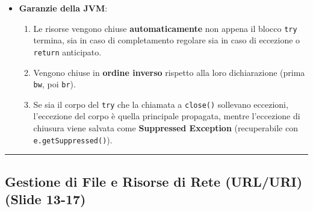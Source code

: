 \documentclass[11pt,a4paper,oneside]{report}
\newcommand{\passthrough}[1]{#1}
\providecommand{\tightlist}{\setlength{\itemsep}{0pt}\setlength{\parskip}{0pt}}
\begin{document}
\begin{itemize}
\tightlist
\item
  \textbf{Garanzie della JVM}:

  \begin{enumerate}
  \def\labelenumi{\arabic{enumi}.}
  \tightlist
  \item
    Le risorse vengono chiuse \textbf{automaticamente} non appena il
    blocco \passthrough{\lstinline!try!} termina, sia in caso di
    completamento regolare sia in caso di eccezione o
    \passthrough{\lstinline!return!} anticipato.
  \item
    Vengono chiuse in \textbf{ordine inverso} rispetto alla loro
    dichiarazione (prima \passthrough{\lstinline!bw!}, poi
    \passthrough{\lstinline!br!}).
  \item
    Se sia il corpo del \passthrough{\lstinline!try!} che la chiamata a
    \passthrough{\lstinline!close()!} sollevano eccezioni, l'eccezione
    del corpo è quella principale propagata, mentre l'eccezione di
    chiusura viene salvata come \textbf{Suppressed Exception}
    (recuperabile con \passthrough{\lstinline!e.getSuppressed()!}).
  \end{enumerate}
\end{itemize}

\begin{center}\rule{0.5\linewidth}{0.5pt}\end{center}

\subsection{Gestione di File e Risorse di Rete (URL/URI) (Slide
13-17)}\label{chap19_gestione-di-file-e-risorse-di-rete-urluri-slide-13-17}
\end{document}
